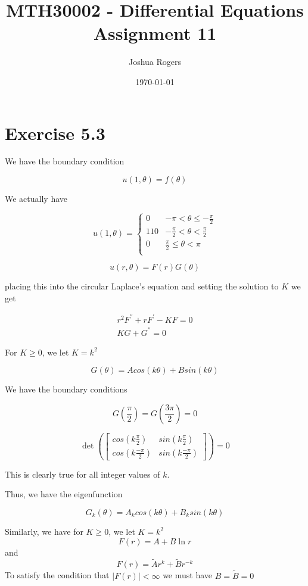 \documentclass{article}
\title{\vspace{-4cm}MTH30002 - Differential Equations Assignment 11}
\author{Joshua Rogers}
\date\today
\begin{document}
\maketitle

\section*{Exercise 5.3}

We have the boundary condition

$$u(1,\theta) = f(\theta)$$

We actually have

$$
u(1,\theta) = \begin{cases}
0 & -\pi < \theta \leq -\frac{\pi}{2} \\
110 & -\frac{\pi}{2} < \theta < \frac{\pi}{2} \\
0 & \frac{\pi}{2} \leq \theta < \pi \\
   \end{cases}
$$

$$u(r,\theta) = F(r)G(\theta)$$

placing this into the circular Laplace's equation and setting the solution to $K$ we get

\begin{align*}
r^2 F^{''} + rF^{'}-KF=0 \\
KG+G^{''}=0
\end{align*}


For $K \geq 0$, we let $K=k^2$

$$G(\theta) = Acos(k\theta) + Bsin(k\theta)$$

We have the boundary conditions

$$G\left(\frac{\pi}{2}\right) = G\left(\frac{3\pi}{2}\right) = 0$$

$$\det \left( \begin{bmatrix} cos\left(k\frac{\pi}{2}\right) & sin\left(k\frac{\pi}{2}\right) \\ cos\left(k\frac{-\pi}{2}\right) & sin\left(k\frac{-\pi}{2}\right) \end{bmatrix} \right) = 0 $$

This is clearly true for all integer values of $k$.

Thus, we have the eigenfunction

$$G_k(\theta) = A_k cos(k\theta) + B_k sin(k\theta)$$



Similarly, we have for $K \geq 0$, we let $K=k^2$
$$F(r) = A + B \ln r$$
and
$$F(r) = \tilde{A} r^k + \tilde{B} r^{-k}$$
To satisfy the condition that $|F(r)| < \infty$ we must have $B = \tilde{B} = 0$
\end{document}
